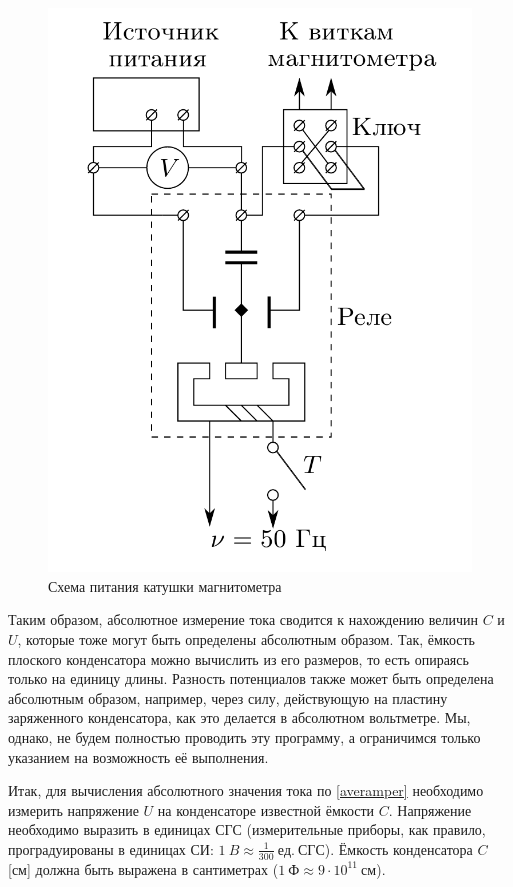 \documentclass[a4paper, 12pt]{article}
\begin{document}
\begin{figure}[h!]
\begin{center}
    \includegraphics[scale=2.8]{3.png}
\end{center}
\caption{Схема питания катушки магнитометра}
\label{ris3}
\end{figure}

Таким образом, абсолютное измерение тока сводится к нахождению величин $C$ и $U$, которые тоже могут быть определены абсолютным образом. Так, ёмкость плоского конденсатора можно вычислить из его размеров, то есть опираясь только на единицу длины. Разность потенциалов также может быть определена абсолютным образом, например, через силу, действующую на пластину заряженного конденсатора, как это делается в абсолютном вольтметре. Мы, однако, не будем полностью проводить эту программу, а ограничимся только указанием на возможность её выполнения.

Итак, для вычисления абсолютного значения тока по \eqref{averamper} необходимо измерить напряжение $U$ на конденсаторе известной ёмкости $C$. Напряжение необходимо выразить в единицах СГС (измерительные приборы, как правило, проградуированы в единицах СИ: $1~B \approx \frac{1}{300}~ед.~СГС$). Ёмкость конденсатора $C$ [см] должна быть выражена в сантиметрах ($1~Ф \approx 9 \cdot 10^{11}~см$).
\end{document}
